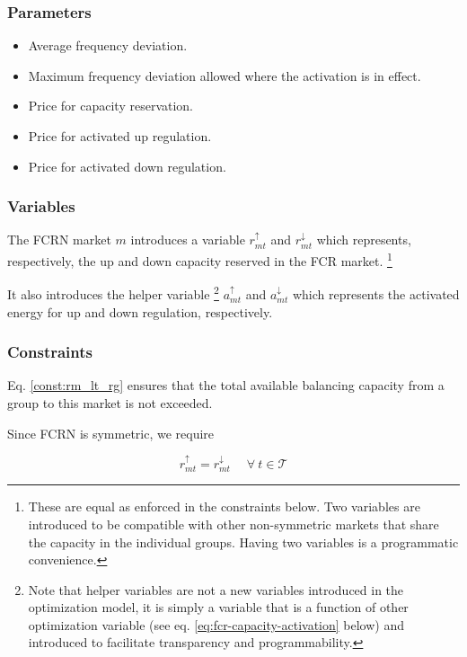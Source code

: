 \documentclass[]{report}
\newcommand{\timesteps}{\mathcal{T}}
\newcommand{\aup}{a^{\uparrow}}
\newcommand{\adown}{a^{\downarrow}}
\newcommand{\rup}{r^{\uparrow}}
\newcommand{\rdown}{r^{\downarrow}}
\newcommand{\cupa}{C^{A\uparrow}}
\newcommand{\cdowna}{C^{A\downarrow}}
\let\oldforall\forall
\renewcommand{\forall}{\; \oldforall \: }
\begin{document}
\subsubsection*{Parameters}

\begin{itemize}
    \item [$\Delta f_t$] Average frequency deviation.
    \item [$\Delta f^N$] Maximum frequency deviation allowed where the activation is in effect.
    \item [$C_{mt}^R$] Price for capacity reservation.
    \item [$\cupa_{mt}$] Price for activated up regulation.
    \item [$\cdowna_{mt}$] Price for activated down regulation.
\end{itemize}

\subsubsection*{Variables}
The FCRN market $m$ introduces a variable $\rup_{mt}$ and $\rdown_{mt}$ which represents, respectively, the up and down capacity reserved in the FCR market.
\footnote{These are equal as enforced in the constraints below. Two variables are introduced to be compatible with other non-symmetric markets that share the capacity in the individual groups. Having two variables is a programmatic convenience.}

It also introduces the helper variable
\footnote{Note that helper variables are not a new variables introduced in the optimization model, it is simply a variable that is a function of other optimization variable (see eq. \ref{eq:fcr-capacity-activation} below) and introduced to facilitate transparency and programmability.}
$\aup_{mt}$ and $\adown_{mt}$ which represents the activated energy for up and down regulation, respectively. 

\subsubsection{Constraints}
Eq. \ref{const:rm_lt_rg} ensures that the total available balancing capacity from a group to this market is not exceeded.

Since FCRN is symmetric, we require

\begin{equation}
    \rup_{mt} = \rdown_{mt} \quad \forall t \in \timesteps
\end{equation}
\end{document}
